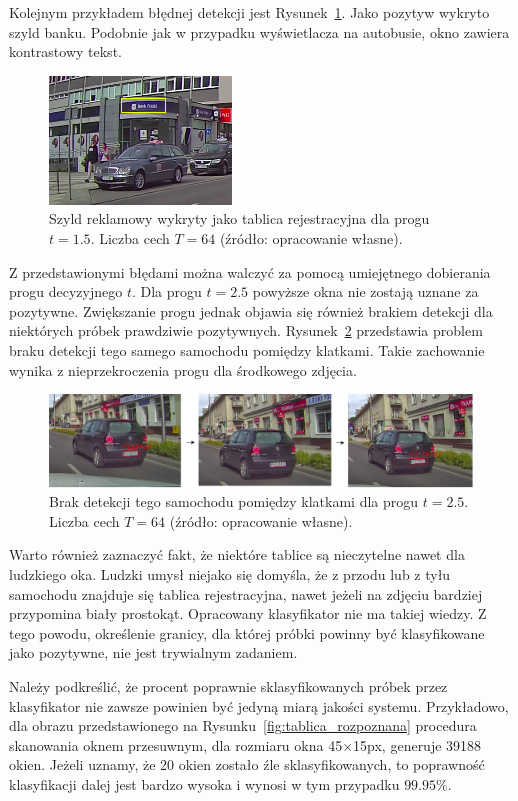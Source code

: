 \FloatBarrier
Kolejnym przykładem błędnej detekcji jest Rysunek~\ref{fig:bank}.
Jako pozytyw wykryto szyld banku.
Podobnie jak w przypadku wyświetlacza na autobusie, okno zawiera kontrastowy tekst.
\begin{figure}[!ht]
    \centering
    \includegraphics[scale=1]{Pictures/bank}
    \caption{Szyld reklamowy wykryty jako tablica rejestracyjna dla progu $t=1.5$. Liczba cech $T=64$ (źródło: opracowanie własne).}
    \label{fig:bank}
\end{figure}
\FloatBarrier
Z przedstawionymi błędami można walczyć za pomocą umiejętnego dobierania progu decyzyjnego $t$.
Dla progu $t=2.5$ powyższe okna nie zostają uznane za pozytywne.
Zwiększanie progu jednak objawia się również brakiem detekcji dla niektórych próbek prawdziwie pozytywnych.
Rysunek~\ref{fig:same_car} przedstawia problem braku detekcji tego samego samochodu pomiędzy klatkami.
Takie zachowanie wynika z nieprzekroczenia progu dla środkowego zdjęcia.
\begin{figure}[!ht]
    \centering
    \includegraphics[scale=0.4]{Pictures/same_car}
    \caption{Brak detekcji tego samochodu pomiędzy klatkami dla progu $t=2.5$. Liczba cech $T=64$ (źródło: opracowanie własne).}
    \label{fig:same_car}
\end{figure}
\FloatBarrier
Warto również zaznaczyć fakt, że niektóre tablice są nieczytelne nawet dla ludzkiego oka.
Ludzki umysł niejako się domyśla, że z przodu lub z tyłu samochodu znajduje się tablica rejestracyjna, nawet jeżeli na zdjęciu bardziej przypomina biały prostokąt.
Opracowany klasyfikator nie ma takiej wiedzy.
Z tego powodu, określenie granicy, dla której próbki powinny być klasyfikowane jako pozytywne, nie jest trywialnym zadaniem.

Należy podkreślić, że procent poprawnie sklasyfikowanych próbek przez klasyfikator nie zawsze powinien być jedyną miarą jakości systemu.
Przykładowo, dla obrazu przedstawionego na Rysunku~\ref{fig:tablica_rozpoznana} procedura skanowania oknem przesuwnym, dla rozmiaru okna
45$\times$15px, generuje 39188 okien.
Jeżeli uznamy, że 20 okien zostało źle sklasyfikowanych, to poprawność klasyfikacji dalej jest bardzo wysoka i wynosi w tym przypadku $99.95\%$.


